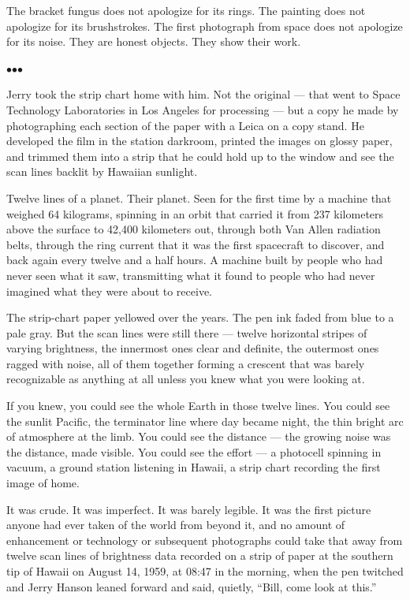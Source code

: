 \documentclass[12pt, letterpaper]{article}
\begin{document}
The bracket fungus does not apologize for its rings. The painting does not apologize for its brushstrokes. The first photograph from space does not apologize for its noise. They are honest objects. They show their work.

\bigskip
\centerline{$\bullet$\quad$\bullet$\quad$\bullet$}
\bigskip

Jerry took the strip chart home with him. Not the original --- that went to Space Technology Laboratories in Los Angeles for processing --- but a copy he made by photographing each section of the paper with a Leica on a copy stand. He developed the film in the station darkroom, printed the images on glossy paper, and trimmed them into a strip that he could hold up to the window and see the scan lines backlit by Hawaiian sunlight.

Twelve lines of a planet. Their planet. Seen for the first time by a machine that weighed 64 kilograms, spinning in an orbit that carried it from 237 kilometers above the surface to 42,400 kilometers out, through both Van Allen radiation belts, through the ring current that it was the first spacecraft to discover, and back again every twelve and a half hours. A machine built by people who had never seen what it saw, transmitting what it found to people who had never imagined what they were about to receive.

The strip-chart paper yellowed over the years. The pen ink faded from blue to a pale gray. But the scan lines were still there --- twelve horizontal stripes of varying brightness, the innermost ones clear and definite, the outermost ones ragged with noise, all of them together forming a crescent that was barely recognizable as anything at all unless you knew what you were looking at.

If you knew, you could see the whole Earth in those twelve lines. You could see the sunlit Pacific, the terminator line where day became night, the thin bright arc of atmosphere at the limb. You could see the distance --- the growing noise was the distance, made visible. You could see the effort --- a photocell spinning in vacuum, a ground station listening in Hawaii, a strip chart recording the first image of home.

It was crude. It was imperfect. It was barely legible. It was the first picture anyone had ever taken of the world from beyond it, and no amount of enhancement or technology or subsequent photographs could take that away from twelve scan lines of brightness data recorded on a strip of paper at the southern tip of Hawaii on August 14, 1959, at 08:47 in the morning, when the pen twitched and Jerry Hanson leaned forward and said, quietly, ``Bill, come look at this.''
\end{document}
